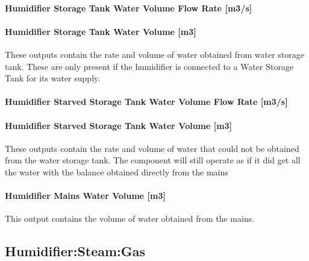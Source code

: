 \paragraph{Humidifier Storage Tank Water Volume Flow Rate {[}m3/s{]}}\label{humidifier-storage-tank-water-volume-flow-rate-m3s}

\paragraph{Humidifier Storage Tank Water Volume {[}m3{]}}\label{humidifier-storage-tank-water-volume-m3}

These outputs contain the rate and volume of water obtained from water storage tank. These are only present if the humidifier is connected to a Water Storage Tank for its water supply.

\paragraph{Humidifier Starved Storage Tank Water Volume Flow Rate {[}m3/s{]}}\label{humidifier-starved-storage-tank-water-volume-flow-rate-m3s}

\paragraph{Humidifier Starved Storage Tank Water Volume {[}m3{]}}\label{humidifier-starved-storage-tank-water-volume-m3}

These outputs contain the rate and volume of water that could not be obtained from the water storage tank. The component will still operate as if it did get all the water with the balance obtained directly from the mains

\paragraph{Humidifier Mains Water Volume {[}m3{]}}\label{humidifier-mains-water-volume-m3}

This output contains the volume of water obtained from the mains.

\subsection{Humidifier:Steam:Gas}\label{humidifiersteamgas}


